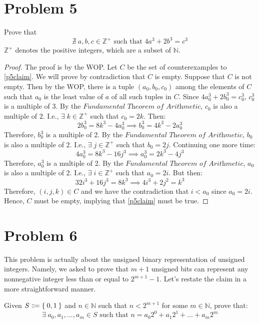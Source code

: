 \documentclass{article}
\begin{document}
\pagebreak

\section{Problem 5}
Prove that
\begin{equation}\label{p5claim}
	\nexists \; a, b, c \in \mathbb{Z^+} \text{ such that } 4a^3 + 2b^3 = c^3
\end{equation}
$\mathbb{Z^+}$ denotes the positive integers, which are a subset of $\mathbb{N}$.

\begin{proof}
	The proof is by the WOP. Let $C$ be the set of counterexamples to \eqref{p5claim}. We will prove by contradiction that $C$ is empty. Suppose that $C$ is not empty. Then by the WOP, there is a tuple $(a_0, b_0, c_0)$ among the elements of $C$ such that $a_0$ is the least value of $a$ of all such tuples in $C$. Since $4a_0^3 + 2b_0^3 = c_0^3$, $c_0^3$ is a multiple of $3$. By the $\textit{Fundamental Theorem of Arithmetic}$, $c_0$ is also a multiple of $2$. I.e., $\exists \; k \in \mathbb{Z^+}$ such that $c_0 = 2k$. Then:
	\[
		2b_0^3 = 8k^3 - 4a_0^3 \implies b_0^3 = 4k^3 - 2a_0^3
	\]
	Therefore, $b_0^3$ is a multiple of 2. By the $\textit{Fundamental Theorem of Arithmetic}$, $b_0$ is also a multiple of $2$. I.e., $\exists \; j \in \mathbb{Z^+}$ such that $b_0 = 2j$. Continuing one more time:
	\[
		4a_0^3 = 8k^3 - 16j^3 \implies a_0^3 = 2k^3 - 4j^3
	\]
	Therefore, $a_0^3$ is a multiple of 2. By the $\textit{Fundamental Theorem of Arithmetic}$, $a_0$ is also a multiple of $2$. I.e., $\exists \; i \in \mathbb{Z^+}$ such that $a_0 = 2i$. But then:
	\[
		32i^3 + 16j^3 = 8k^3 \implies 4i^3 + 2j^2 = k^3
	\]
	Therefore, $(i, j, k) \in C$ and we have the contradiction that $i < a_0$ since $a_0 = 2i$. Hence, $C$ must be empty, implying that \eqref{p5claim} must be true.

\end{proof}

\pagebreak

\section{Problem 6}
This problem is actually about the unsigned binary representation of unsigned integers. Namely, we asked to prove that $m + 1$ unsigned bits can represent any nonnegative integer less than or equal to $2^{m + 1} - 1$. Let's restate the claim in a more straightforward manner.

Given $S \Coloneqq \Set{0, 1}$ and $n \in \mathbb{N}$ such that $n < 2^{m + 1}$ for some $m \in \mathbb{N}$, prove that:
\begin{equation}\label{p6claim}
	\exists \; a_0, a_1, ..., a_m \in S \text{ such that } n = a_0 2^0 + a_1 2^1 + ... + a_m 2^m
\end{equation}
\end{document}
